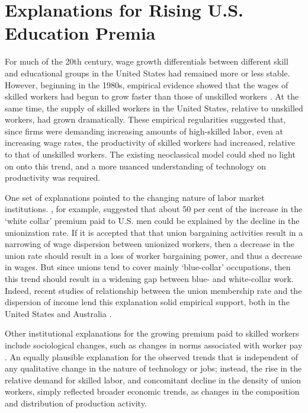 \section{Explanations for Rising U.S. Education Premia}

For much of the 20th century, wage growth differentials between different skill and educational groups in the United States had remained more or less stable. However, beginning in the 1980s, empirical evidence showed that the wages of skilled workers had begun to grow faster than those of unskilled workers \citep{Juhn1993}. At the same time, the supply of skilled workers in the United States, relative to unskilled workers, had grown dramatically. These empirical regularities suggested that, since firms were demanding increasing amounts of high-skilled labor, even at increasing wage rates, the productivity of skilled workers had increased, relative to that of unskilled workers. The existing neoclassical model could shed no light on onto this trend, and a more nuanced understanding of technology on productivity was required.

One set of explanations pointed to the changing nature of labor market institutions. \citet{Freeman1994}, for example, suggested that about 50 per cent of the increase in the `white collar' premium paid to U.S. men could be explained by the decline in the unionization rate. If it is accepted that that union bargaining activities result in a narrowing of wage dispersion between unionized workers, then a decrease in the union rate should result in a loss of worker bargaining power, and thus a decrease in wages. But since unions tend to cover mainly `blue-collar' occupations, then this trend should result in a widening gap between blue- and white-collar work. Indeed, recent studies of relationship between the union membership rate and the dispersion of income lend this explanation solid empirical support, both in the United States \citep{Card2004,DiNardo1996} and Australia \citep{Borland1996}.

Other institutional explanations for the growing premium paid to skilled workers include sociological changes, such as changes in norms associated with worker pay \citep{Mitchell1989}. An equally plausible explanation for the observed trends that is independent of any qualitative change in the nature of technology or jobs; instead, the rise in the relative demand for skilled labor, and concomitant decline in the density of union workers,  simply reflected broader economic trends, as changes in the composition and distribution of production activity.

